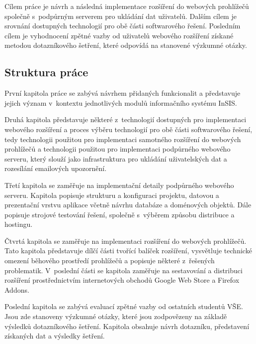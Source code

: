Cílem práce je návrh a následná implementace rozšíření do webových prohlížečů společně s~podpůrným serverem pro ukládání dat uživatelů. Dalším cílem je srovnání dostupných technologií pro obě části softwarového řešení. Posledním cílem je vyhodnocení zpětné vazby od uživatelů webového rozšíření získané metodou dotazníkového šetření, které odpovídá na stanovené výzkumné otázky.

\subsection*{Struktura práce}

První kapitola práce se zabývá návrhem přidaných funkcionalit a představuje jejich význam v~kontextu jednotlivých modulů informačního systému InSIS.

Druhá kapitola představuje některé z~technologií dostupných pro implementaci webového rozšíření a proces výběru technologií pro obě části softwarového řešení, tedy technologii použitou pro implementaci samotného rozšíření do webových prohlížečů a technologii použitou pro implementaci podpůrného webového serveru, který slouží jako infrastruktura pro ukládání uživatelských dat a rozesílání emailových upozornění.

Třetí kapitola se zaměřuje na implementační detaily podpůrného webového serveru. Kapitola popisuje strukturu a konfiguraci projektu, datovou a prezentační vrstvu aplikace včetně návrhu databáze a doménových objektů. Dále popisuje strojové testování řešení, společně s~výběrem způsobu distribuce a hostingu.  

Čtvrtá kapitola se zaměřuje na implementaci rozšíření do webových prohlížečů. Tato kapitola představuje dílčí části tvořící balíček rozšíření, vysvětluje technické omezení běhového prostředí prohlížečů a popisuje některé z~řešených problematik. V~poslední části se kapitola zaměřuje na sestavování a distribuci rozšíření prostřednictvím internetových obchodů Google Web Store a Firefox Addons.

Poslední kapitola se zabývá evaluací zpětné vazby od ostatních studentů VŠE. Jsou zde stanoveny výzkumné otázky, které jsou zodpovězeny na základě výsledků dotazníkového šetření. Kapitola obsahuje návrh dotazníku, představení získaných dat a výsledky šetření. 



